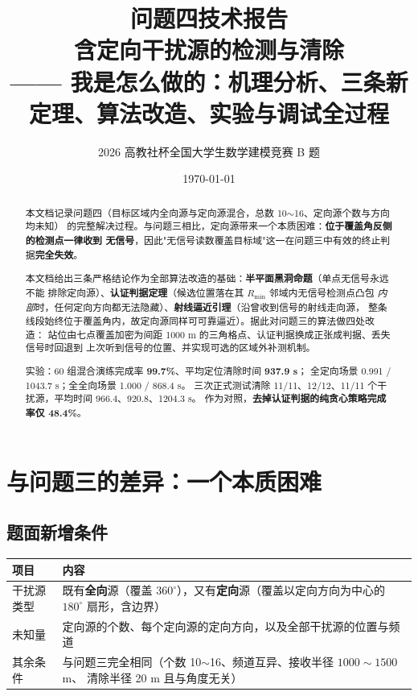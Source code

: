 

\title{\heiti 问题四技术报告\\[4pt]
       \large 含定向干扰源的检测与清除\\[2pt]
       \normalsize —— 我是怎么做的：机理分析、三条新定理、算法改造、实验与调试全过程}
\author{2026 高教社杯全国大学生数学建模竞赛 B 题}
\date{\today}


\maketitle
\thispagestyle{fancy}

\begin{abstract}
\noindent
本文档记录问题四（目标区域内全向源与定向源混合，总数 10$\sim$16、定向源个数与方向均未知）
的完整解决过程。与问题三相比，定向源带来一个本质困难：\textbf{位于覆盖角反侧的检测点一律收到
无信号}，因此"无信号读数覆盖目标域"这一在问题三中有效的终止判据\textbf{完全失效}。

本文档给出三条严格结论作为全部算法改造的基础：\textbf{半平面黑洞命题}（单点无信号永远不能
排除定向源）、\textbf{认证判据定理}（候选位置落在其 $R_{\min}$ 邻域内无信号检测点凸包
\emph{内部}时，任何定向方向都无法隐藏）、\textbf{射线逼近引理}（沿曾收到信号的射线走向源，
整条线段始终位于覆盖角内，故定向源同样可可靠逼近）。据此对问题三的算法做四处改造：
站位由七点覆盖加密为间距 1000 m 的三角格点、认证判据换成正张成判据、丢失信号时回退到
上次听到信号的位置、并实现可选的区域外补测机制。

实验：60 组混合演练完成率 \textbf{99.7\%}、平均定位清除时间 \textbf{937.9 s}；
全定向场景 0.991 / 1043.7 s；全全向场景 1.000 / 868.4 s。
三次正式测试清除 11/11、12/12、11/11 个干扰源，平均时间 966.4、920.8、1204.3 s。
作为对照，\textbf{去掉认证判据的纯贪心策略完成率仅 48.4\%}。
\end{abstract}

\tableofcontents
\newpage

\section{与问题三的差异：一个本质困难}

\subsection{题面新增条件}

\begin{center}
\begin{tabular}{p{3.6cm}p{11.2cm}}
\toprule
项目 & 内容 \\ \midrule
干扰源类型 & 既有\textbf{全向}源（覆盖 $360^{\circ}$），又有\textbf{定向}源（覆盖以定向方向为中心的
$180^{\circ}$ 扇形，含边界） \\
未知量 & 定向源的个数、每个定向源的定向方向，以及全部干扰源的位置与频道 \\
其余条件 & 与问题三完全相同（个数 10$\sim$16、频道互异、接收半径 $1000\sim1500$ m、
清除半径 20 m 且与角度无关） \\
\bottomrule
\end{tabular}
\end{center}

